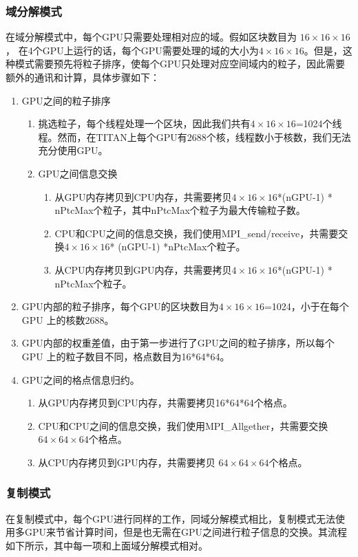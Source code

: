 \subsubsection{域分解模式}
在域分解模式中，每个GPU只需要处理相对应的域。假如区块数目为 $16 \times 16 \times 16$， 在4个GPU上运行的话，每个GPU需要处理的域的大小为$4 \times 16 \times 16$。但是，这种模式需要预先将粒子排序，使每个GPU只处理对应空间域内的粒子，因此需要额外的通讯和计算，具体步骤如下：
\begin{enumerate}
  \item GPU之间的粒子排序
  \begin{enumerate}
    \item 挑选粒子，每个线程处理一个区块，因此我们共有$4 \times 16 \times 16$=1024个线程。然而，在TITAN上每个GPU有2688个核，线程数小于核数，我们无法充分使用GPU。
    \item GPU之间信息交换
    \begin{enumerate}
      \item 从GPU内存拷贝到CPU内存，共需要拷贝$4 \times 16 \times 16$*(nGPU-1) * nPtcMax个粒子，其中nPtcMax个粒子为最大传输粒子数。
      \item CPU和CPU之间的信息交换，我们使用MPI\_send/receive，共需要交换$4 \times 16 \times 16$* (nGPU-1) *nPtcMax个粒子。
      \item 从CPU内存拷贝到GPU内存，共需要拷贝$4 \times 16 \times 16$*(nGPU-1) * nPtcMax个粒子。
    \end{enumerate}
  \end{enumerate}
  \item GPU内部的粒子排序，每个GPU的区块数目为$4 \times 16 \times 16$=1024，小于在每个 GPU 上的核数2688。
  \item GPU内部的权重差值，由于第一步进行了GPU之间的粒子排序，所以每个 GPU 上的粒子数目不同，格点数目为16*64*64。
  \item GPU之间的格点信息归约。
  \begin{enumerate}
    \item 从GPU内存拷贝到CPU内存，共需要拷贝16*64*64个格点。
    \item CPU和CPU之间的信息交换，我们使用MPI\_Allgether，共需要交换$64 \times 64 \times 64$个格点。
    \item 从CPU内存拷贝到GPU内存，共需要拷贝 $64 \times 64 \times 64$个格点。
  \end{enumerate}
\end{enumerate}

\subsubsection{复制模式}
在复制模式中，每个GPU进行同样的工作，同域分解模式相比，复制模式无法使用多GPU来节省计算时间，但是也无需在GPU之间进行粒子信息的交换。其流程如下所示，其中每一项和上面域分解模式相对。

